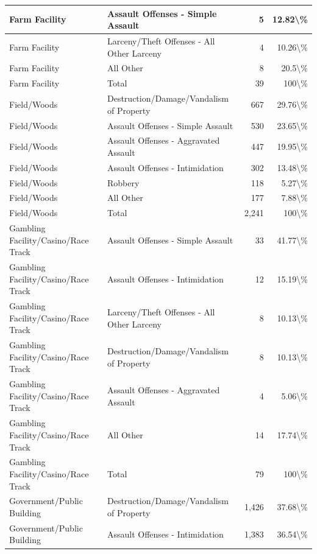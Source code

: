 \documentclass[
]{krantz}
\begin{document}
\begin{longtable}[t]{l|l|r|r}
\hline
Farm Facility & Assault Offenses - Simple Assault & 5 & 12.82\textbackslash{}\%\\
\hline
Farm Facility & Larceny/Theft Offenses - All Other Larceny & 4 & 10.26\textbackslash{}\%\\
\hline
Farm Facility & All Other & 8 & 20.5\textbackslash{}\%\\
\hline
Farm Facility & Total & 39 & 100\textbackslash{}\%\\
\hline
Field/Woods & Destruction/Damage/Vandalism of Property & 667 & 29.76\textbackslash{}\%\\
\hline
Field/Woods & Assault Offenses - Simple Assault & 530 & 23.65\textbackslash{}\%\\
\hline
Field/Woods & Assault Offenses - Aggravated Assault & 447 & 19.95\textbackslash{}\%\\
\hline
Field/Woods & Assault Offenses - Intimidation & 302 & 13.48\textbackslash{}\%\\
\hline
Field/Woods & Robbery & 118 & 5.27\textbackslash{}\%\\
\hline
Field/Woods & All Other & 177 & 7.88\textbackslash{}\%\\
\hline
Field/Woods & Total & 2,241 & 100\textbackslash{}\%\\
\hline
Gambling Facility/Casino/Race Track & Assault Offenses - Simple Assault & 33 & 41.77\textbackslash{}\%\\
\hline
Gambling Facility/Casino/Race Track & Assault Offenses - Intimidation & 12 & 15.19\textbackslash{}\%\\
\hline
Gambling Facility/Casino/Race Track & Larceny/Theft Offenses - All Other Larceny & 8 & 10.13\textbackslash{}\%\\
\hline
Gambling Facility/Casino/Race Track & Destruction/Damage/Vandalism of Property & 8 & 10.13\textbackslash{}\%\\
\hline
Gambling Facility/Casino/Race Track & Assault Offenses - Aggravated Assault & 4 & 5.06\textbackslash{}\%\\
\hline
Gambling Facility/Casino/Race Track & All Other & 14 & 17.74\textbackslash{}\%\\
\hline
Gambling Facility/Casino/Race Track & Total & 79 & 100\textbackslash{}\%\\
\hline
Government/Public Building & Destruction/Damage/Vandalism of Property & 1,426 & 37.68\textbackslash{}\%\\
\hline
Government/Public Building & Assault Offenses - Intimidation & 1,383 & 36.54\textbackslash{}\%\\

\end{longtable}
\end{document}
